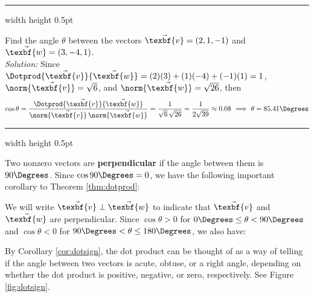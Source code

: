\hrule width \textwidth height 0.5pt
\begin{exmp}
 Find the angle $\theta$ between the vectors $\vec{\texbf{v}} = (2,1,-1)$ and $\vec{\texbf{w}} =
 (3,-4,1)$.\vspace{2mm}\\\emph{Solution:}
 Since $\Dotprod{\vec{\texbf{v}}}{\vec{\texbf{w}}} = (2)(3) + (1)(-4) + (-1)(1) = 1$,
 $\norm{\vec{\texbf{v}}} = \sqrt{6}$, and $\norm{\vec{\texbf{w}}} = \sqrt{26}$, then
 \begin{displaymath}
  \cos \theta = \frac{\Dotprod{\vec{\texbf{v}}}{\vec{\texbf{w}}}}{\norm{\vec{\texbf{v}}} \, \norm{\vec{\texbf{w}}}} =
  \frac{1}{\sqrt{6}\,\sqrt{26}} = \frac{1}{2 \sqrt{39}} \approx 0.08 ~ \Longrightarrow ~ \theta = 85.41\Degrees
 \end{displaymath}
\end{exmp}
\hrule width \textwidth height 0.5pt
\vspace{2mm}

Two nonzero vectors are \textbf{perpendicular} if the angle between them is $90\Degrees$.
Since $\cos 90\Degrees = 0$, we have the following important corollary to Theorem \ref{thm:dotprod}:

We will write $\vec{\texbf{v}} \perp \vec{\texbf{w}}$ to indicate that $\vec{\texbf{v}}$ and $\vec{\texbf{w}}$ are perpendicular.
\newpage
Since $\cos \theta > 0$ for $0\Degrees \le \theta < 90\Degrees$ and $\cos \theta < 0$ for
$90\Degrees < \theta \le 180\Degrees$, we also have:


By Corollary \ref{cor:dotsign}, the dot product can be thought of as a way of telling if the angle between two vectors
is acute, obtuse, or a right angle, depending on whether the dot product is positive, negative, or zero,
respectively. See Figure \ref{fig:dotsign}.

